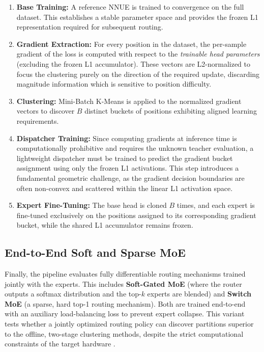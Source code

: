 \begin{enumerate}
	\item \textbf{Base Training:} A reference NNUE is trained to convergence on the full dataset. This establishes a stable parameter space and provides the frozen L1 representation required for subsequent routing.
	\item \textbf{Gradient Extraction:} For every position in the dataset, the per-sample gradient of the loss is computed with respect to the \emph{trainable head parameters} (excluding the frozen L1 accumulator). These vectors are L2-normalized to focus the clustering purely on the direction of the required update, discarding magnitude information which is sensitive to position difficulty.
	\item \textbf{Clustering:} Mini-Batch K-Means is applied to the normalized gradient vectors to discover $B$ distinct buckets of positions exhibiting aligned learning requirements.
	\item \textbf{Dispatcher Training:} Since computing gradients at inference time is computationally prohibitive and requires the unknown teacher evaluation, a lightweight dispatcher must be trained to predict the gradient bucket assignment using only the frozen L1 activations. This step introduces a fundamental geometric challenge, as the gradient decision boundaries are often non-convex and scattered within the linear L1 activation space.
	\item \textbf{Expert Fine-Tuning:} The base head is cloned $B$ times, and each expert is fine-tuned exclusively on the positions assigned to its corresponding gradient bucket, while the shared L1 accumulator remains frozen.
\end{enumerate}

\subsection{End-to-End Soft and Sparse MoE}

Finally, the pipeline evaluates fully differentiable routing mechanisms trained jointly with the experts. This includes \textbf{Soft-Gated MoE} (where the router outputs a softmax distribution and the top-$k$ experts are blended) and \textbf{Switch MoE} (a sparse, hard top-1 routing mechanism). Both are trained end-to-end with an auxiliary load-balancing loss to prevent expert collapse. This variant tests whether a jointly optimized routing policy can discover partitions superior to the offline, two-stage clustering methods, despite the strict computational constraints of the target hardware \parencite{shazeer2017} \parencite{fedus2021}.


